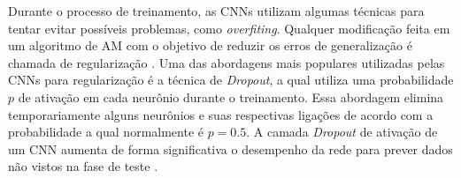Durante o processo de treinamento, as CNNs utilizam algumas técnicas para tentar evitar possíveis problemas, como \emph{overfiting}. Qualquer modificação feita em um algoritmo de AM com o objetivo de reduzir os erros de generalização é chamada de regularização \cite{ref:goodfellow}. Uma das abordagens mais populares utilizadas pelas CNNs para regularização é a técnica de \emph{Dropout}, a qual utiliza uma probabilidade $p$ de ativação em cada neurônio durante o treinamento. Essa abordagem elimina temporariamente alguns neurônios e suas respectivas ligações de acordo com a probabilidade a qual normalmente é $p = 0.5$. A camada \textit{Dropout} de ativação de um CNN aumenta de forma significativa o desempenho da rede para prever dados não vistos na fase de teste \cite{ref:khan}.
